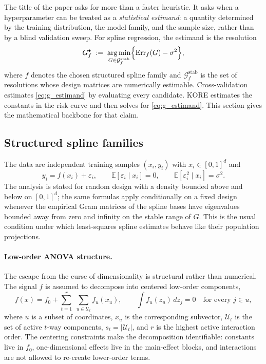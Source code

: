\documentclass{article}
\DeclareMathOperator*{\argmin}{arg\,min}
\newcommand{\EE}{\mathbb{E}}
\newcommand{\Err}{\mathrm{Err}}
\newcommand{\KORE}{\textsc{KORE}}
\begin{document}
The title of the paper asks for more than a faster heuristic. It asks when a hyperparameter can be treated as a \emph{statistical estimand}: a quantity determined by the training distribution, the model family, and the sample size, rather than by a blind validation sweep. For spline regression, the estimand is the resolution
\begin{equation}
    G_f^\bullet \;:=\; \argmin_{G\in\mathcal{G}_f^{\mathrm{stab}}} \Bigl\{\Err_f(G)-\sigma^2\Bigr\},
    \label{eq:g_estimand}
\end{equation}
where $f$ denotes the chosen structured spline family and $\mathcal{G}_f^{\mathrm{stab}}$ is the set of resolutions whose design matrices are numerically estimable. Cross-validation estimates \eqref{eq:g_estimand} by evaluating every candidate. \KORE{} estimates the constants in the risk curve and then solves for \eqref{eq:g_estimand}. This section gives the mathematical backbone for that claim.

\subsection{Structured spline families}
\label{sec:setup}

The data are independent training samples $(x_i,y_i)$ with $x_i\in[0,1]^d$ and
\begin{equation}
    y_i = f(x_i)+\varepsilon_i,
    \qquad
    \EE[\varepsilon_i\mid x_i]=0,
    \qquad
    \EE[\varepsilon_i^2\mid x_i]=\sigma^2.
    \label{eq:data_model}
\end{equation}
The analysis is stated for random design with a density bounded above and below on $[0,1]^d$; the same formulas apply conditionally on a fixed design whenever the empirical Gram matrices of the spline bases have eigenvalues bounded away from zero and infinity on the stable range of $G$. This is the usual condition under which least-squares spline estimates behave like their population projections.

\paragraph{Low-order ANOVA structure.}
The escape from the curse of dimensionality is structural rather than numerical. The signal $f$ is assumed to decompose into centered low-order components,
\begin{equation}
    f(x) = f_0 + \sum_{t=1}^{r}\;\sum_{u\in\mathcal{U}_t} f_u(x_u),
    \qquad
    \int f_u(z_u)\,dz_j =0\quad\text{for every }j\in u,
    \label{eq:anova}
\end{equation}
where $u$ is a subset of coordinates, $x_u$ is the corresponding subvector, $\mathcal{U}_t$ is the set of active $t$-way components, $s_t=|\mathcal{U}_t|$, and $r$ is the highest active interaction order. The centering constraints make the decomposition identifiable: constants live in $f_0$, one-dimensional effects live in the main-effect blocks, and interactions are not allowed to re-create lower-order terms.
\end{document}
